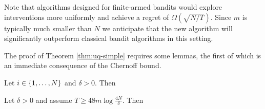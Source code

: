Note that algorithms designed for finite-armed bandits would explore interventions more uniformly and achieve a regret of $\Omega(\sqrt{N/T})$.
Since $m$ is typically much smaller than $N$ we anticipate that the new algorithm will significantly outperform classical bandit algorithms in
this setting.

The proof of Theorem \ref{thm:uq-simple} requires some lemmas, the first of which is an immediate consequence of the Chernoff bound.

\begin{lemma}\label{lem:conc1}
Let $i \in \left\{1,\ldots, N\right\}$ and $\delta > 0$. Then
\end{lemma}

\iffalse
\begin{proof}
Let $Z_t = \ind{X_{i,t} = 1} \in \set{0,1}$.
Then
\eq{
\hat q_i = \frac{2}{T} \sum_{t=1}^{T/2} Z_t\,.
}
Now $Z_1,\ldots,Z_{T/2}$ is an i.i.d.\ sequence of Bernoulli random variables with with mean $q_i$. The result follows from the Chernoff bound.
\end{proof}
\fi

\begin{lemma}\label{lem:m_est}
Let $\delta >0$ and assume $T \geq 48m \log\frac{4N}{\delta}$. Then
\end{lemma}



